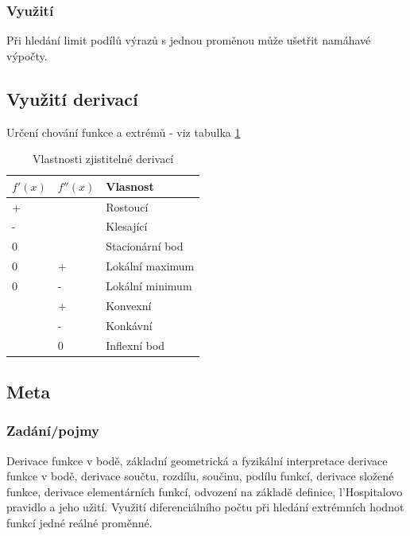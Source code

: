 \documentclass[12pt]{article}
\begin{document}
\subsubsection{Využití}
Při hledání limit podílů výrazů s jednou proměnou může ušetřit namáhavé výpočty.
\subsection{Využití derivací}
\label{sec:vyuziti_derivaci}
Určení chování funkce a extrémů - viz tabulka \ref{table:vlastnosti}
\begin{table}[h!]
\centering
\begin{tabular}{|l|l|l|}
\hline
$f'(x)$ & $f''(x)$ & Vlasnost        \\ \hline
+       &          & Rostoucí        \\ \hline
-       &          & Klesající       \\ \hline
0       &          & Stacionární bod \\ \hline
0       & +        & Lokální maximum \\ \hline
0       & -        & Lokální minimum \\ \hline
        & +        & Konvexní        \\ \hline
        & -       & Konkávní        \\ \hline
        & 0        & Inflexní bod    \\ \hline
\end{tabular}
\caption{Vlastnosti zjistitelné derivací}
\label{table:vlastnosti}
\end{table}
\subsection{Meta}
\subsubsection{Zadání/pojmy}
Derivace funkce v bodě, základní geometrická a fyzikální interpretace derivace funkce v bodě, derivace součtu, rozdílu, součinu, podílu funkcí, derivace složené funkce, derivace elementárních funkcí, odvození na základě definice, l'Hospitalovo pravidlo a jeho užití. Využití diferenciálního počtu při hledání extrémních hodnot funkcí jedné reálné proměnné.
\end{document}
